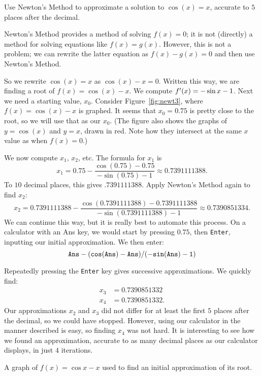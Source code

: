 \begin{example} \label{Ex:3.8.Eg2}
Use Newton's Method to approximate a solution to $\cos(x) = x$, accurate to $5$ places after the decimal.

\solution Newton's Method provides a method of solving $f(x) = 0$; it is not (directly) a method for solving equations like $f(x) = g(x)$. However, this is not a problem; we can rewrite the latter equation as $f(x) - g(x)=0$ and then use Newton's Method. 

So we rewrite $\cos(x)=x$ as $\cos(x)-x=0$.  Written this way, we are finding a root of $f(x)=\cos(x)-x$.  We compute $f'(x)=-\sin{x} - 1$.  Next we need a starting value, $x_0$.  Consider Figure~\ref{fig:newt3}, where $f(x) = \cos(x)-x$ is graphed. It seems that $x_0=0.75$ is pretty close to the root, so we will use that as our $x_0$. (The figure also shows the graphs of $y=\cos(x)$ and $y=x$, drawn in red. Note how they intersect at the same $x$ value as when $f(x) = 0$.)

We now compute $x_1$, $x_2$, etc.  The formula for $x_1$ is 
$$x_1 = 0.75 - \frac{\cos(0.75)-0.75}{-\sin(0.75)-1}\approx 0.7391111388.$$
To $10$ decimal places, this gives $.7391111388$.  Apply Newton's Method again to find $x_2$:
$$x_2 = 0.7391111388 - \frac{\cos(0.7391111388)-0.7391111388}{-\sin(0.7391111388)-1}\approx 0.7390851334.$$
We can continue this way, but it is really best to automate this process.  On a calculator with an Ans key, we would start by pressing $0.75$, then \texttt{Enter}, inputting our initial approximation. We then enter:
$$\text{\tt Ans} - {\tt (cos(Ans)-Ans)/(-sin(Ans)-1)}$$ 

Repeatedly pressing the \texttt{Enter} key gives successive approximations.  We quickly find:
\begin{align*}
x_3 &= 0.7390851332\\
x_4 &= 0.7390851332.
\end{align*}
Our approximations $x_2$ and $x_3$ did not differ for at least the first $5$ places after the decimal, so we could have stopped. However, using our calculator in the manner described is easy, so finding $x_4$ was not hard. It is interesting to see how we found an approximation, accurate to as many decimal places as our calculator displays, in just $4$ iterations.
\end{example}

\begin{marginfigure}[-6cm]
\caption{A graph of $f(x)=\cos x-x$ used to find an initial approximation of its root.}\label{fig:newt3}
\end{marginfigure}